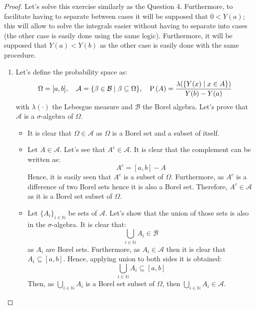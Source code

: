 \documentclass[11pt]{article}
\theoremstyle{definition}
\theoremstyle{remark}
\theoremstyle{remark}
\newcommand{\N}{\mathbb{N}}
\begin{document}
\begin{proof}
  Let's solve this exercise similarly as the Question 4. Furthermore,
  to facilitate having to separate between cases it will be supposed
  that $0 < Y(a)$; this will allow to solve the integrals easier
  without having to separate into cases (the other case is easily done
  using the same logic). Furthermore, it will be supposed that
  $Y(a) < Y(b)$ as the other case is easily done with the same
  procedure.
  \begin{enumerate}[label=\alph*)]
  \item Let's define the probability space as:
    \begin{equation*}
      \Omega = [a, b], \quad \mathcal{A} = \{\beta \in \mathcal{B} \mid
      \beta \subseteq \Omega\}, \quad
      \P{A} = \frac{\lambda(\{Y(x) \mid x \in A\})}{Y(b) - Y(a)}
      \end{equation*}
      with $\lambda(\cdot)$ the Lebesgue measure and $\mathcal{B}$ the
      Borel algebra. Let's prove that $\mathcal{A}$ is a
      $\sigma$-algebra of $\Omega$.
      \begin{itemize}
      \item It is clear that $\Omega \in \mathcal{A}$ as $\Omega$ is a
        Borel set and a subset of itself.

      \item Let $A \in \mathcal{A}$. Let's see that
        $A^c \in \mathcal{A}$. It is clear that the complement can be
        written as:
        \begin{equation*}
          A^c = [a, b] - A
        \end{equation*}
        Hence, it is easily seen that $A^c$ is a subset of
        $\Omega$. Furthermore, as $A^c$ is a difference of two Borel
        sets hence it is also a Borel set. Therefore,
        $A^c \in \mathcal{A}$ as it is a Borel set subset of $\Omega$.

      \item Let $\{A_i\}_{i \in \N}$ be sets of $\mathcal{A}$. Let's
        show that the union of those sets is also in the
        $\sigma$-algebra. It is clear that:
        \begin{equation*}
          \bigcup_{i \in \N} A_i \in \mathcal{B}
        \end{equation*}
        as $A_i$ are Borel sets. Furthermore, as $A_i \in \mathcal{A}$
        then it is clear that $A_i \subseteq [a, b]$. Hence,
        applying union to both sides it is obtained:
        \begin{equation*}
          \bigcup_{i \in \N} A_i \subseteq [a, b]
        \end{equation*}
        Then, as $\bigcup\limits_{i \in \N} A_i$ is a Borel set subset of
        $\Omega$, then $\bigcup\limits_{i \in \N} A_i \in \mathcal{A}$.


\end{itemize}
\end{enumerate}
\end{proof}
\end{document}
